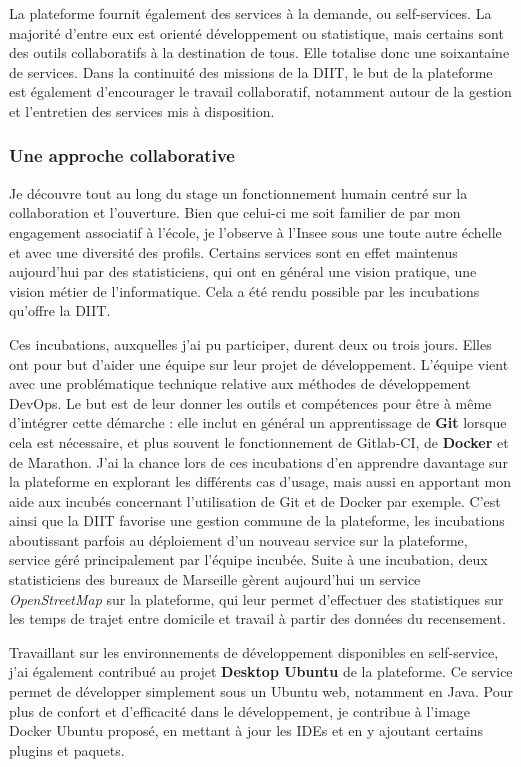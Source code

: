 La plateforme fournit également des services à la demande, ou self-services. La majorité d'entre eux est orienté développement ou statistique, mais certains sont des outils collaboratifs à la destination de tous. Elle totalise donc une soixantaine de services. Dans la continuité des missions de la DIIT, le but de la plateforme est également d'encourager le travail collaboratif, notamment autour de la gestion et l'entretien des services mis à disposition.

\subsubsection{Une approche collaborative}
Je découvre tout au long du stage un fonctionnement humain centré sur la collaboration et l'ouverture. Bien que celui-ci me soit familier de par mon engagement associatif à l'école, je l'observe à l'Insee sous une toute autre échelle et avec une diversité des profils. Certains services sont en effet maintenus aujourd'hui par des statisticiens, qui ont en général une vision pratique, une vision métier de l'informatique. Cela a été rendu possible par les incubations qu'offre la DIIT.
\newline

Ces incubations, auxquelles j'ai pu participer, durent deux ou trois jours. Elles ont pour but d'aider une équipe sur leur projet de développement. L'équipe vient avec une problématique technique relative aux méthodes de développement DevOps. Le but est de leur donner les outils et compétences pour être à même d'intégrer cette démarche : elle inclut en général un apprentissage de \textbf{Git} lorsque cela est nécessaire, et plus souvent le fonctionnement de Gitlab-CI, de \textbf{Docker} et de Marathon. J'ai la chance lors de ces incubations d'en apprendre davantage sur la plateforme en explorant les différents cas d'usage, mais aussi en apportant mon aide aux incubés concernant l'utilisation de Git et de Docker par exemple. C'est ainsi que la DIIT favorise une gestion commune de la plateforme, les incubations aboutissant parfois au déploiement d'un nouveau service sur la plateforme, service géré principalement par l'équipe incubée. Suite à une incubation, deux statisticiens des bureaux de Marseille gèrent aujourd'hui un service \textit{OpenStreetMap} sur la plateforme, qui leur permet d'effectuer des statistiques sur les temps de trajet entre domicile et travail à partir des données du recensement.
\newline

Travaillant sur les environnements de développement disponibles en self-service, j'ai également contribué au projet \textbf{Desktop Ubuntu} de la plateforme. Ce service permet de développer simplement sous un Ubuntu web, notamment en Java. Pour plus de confort et d'efficacité dans le développement, je contribue à l'image Docker Ubuntu proposé, en mettant à jour les IDEs et en y ajoutant certains plugins et paquets.
\label{section 2.2.2}

